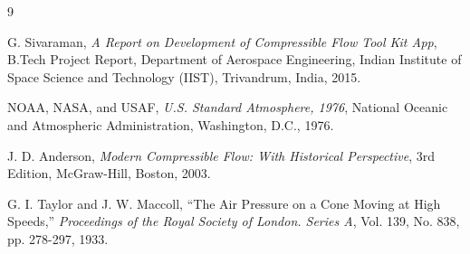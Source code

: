 \begin{thebibliography}{9}

G. Sivaraman, 
\emph{A Report on Development of Compressible Flow Tool Kit App}, 
B.Tech Project Report, Department of Aerospace Engineering, Indian Institute of Space Science and Technology (IIST), Trivandrum, India, 2015.

NOAA, NASA, and USAF, 
\emph{U.S. Standard Atmosphere, 1976}, 
National Oceanic and Atmospheric Administration, Washington, D.C., 1976.

J. D. Anderson, 
\emph{Modern Compressible Flow: With Historical Perspective}, 
3rd Edition, McGraw-Hill, Boston, 2003.

G. I. Taylor and J. W. Maccoll, 
``The Air Pressure on a Cone Moving at High Speeds,'' 
\emph{Proceedings of the Royal Society of London. Series A}, Vol. 139, No. 838, pp. 278-297, 1933.

\end{thebibliography}
